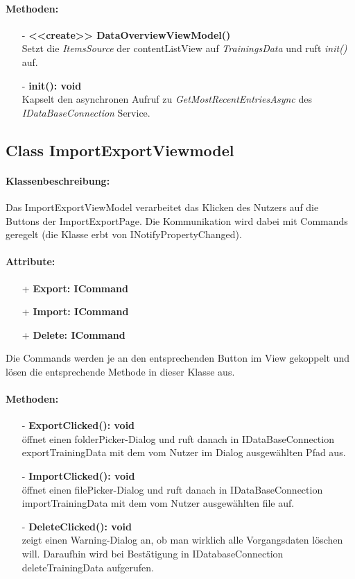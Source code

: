 \documentclass[a4paper,12pt]{article}
\begin{document}
\paragraph{Methoden:}
\begin{itemize}
    \item[-] \textbf{<<create>> DataOverviewViewModel()} \\ Setzt die \textit{ItemsSource} der contentListView auf \textit{TrainingsData} und ruft \textit{init()} auf.
    \item[-] \textbf{init(): void} \\ Kapselt den asynchronen Aufruf zu \textit{GetMostRecentEntriesAsync} des \textit{IDataBaseConnection} Service.
\end{itemize} 

\subsection{Class ImportExportViewmodel}

\paragraph{Klassenbeschreibung:}
Das ImportExportViewModel verarbeitet das Klicken des Nutzers auf die Buttons  der ImportExportPage.
Die Kommunikation wird dabei mit Commands geregelt (die Klasse erbt von INotifyPropertyChanged).
\paragraph{Attribute:}
\begin{itemize}
	\item[+] \textbf{Export: ICommand}
	\item[+] \textbf{Import: ICommand}
	\item[+] \textbf{Delete: ICommand}
\end{itemize}
Die Commands werden je an den entsprechenden Button im View gekoppelt und lösen die entsprechende Methode in dieser Klasse aus.
\paragraph{Methoden:}
\begin{itemize}
    \item[-] \textbf{ExportClicked(): void}\\ öffnet einen folderPicker-Dialog und ruft danach in IDataBaseConnection exportTrainingData mit dem vom Nutzer im Dialog ausgewählten Pfad aus.%
    \item[-] \textbf{ImportClicked(): void}\\ öffnet einen filePicker-Dialog und ruft danach in IDataBaseConnection importTrainingData mit dem vom Nutzer ausgewählten file auf.
    \item[-] \textbf{DeleteClicked(): void}\\zeigt einen Warning-Dialog an, ob man wirklich alle Vorgangsdaten löschen will. Daraufhin wird bei Bestätigung in IDatabaseConnection deleteTrainingData aufgerufen.
\end{itemize} 
\end{document}
